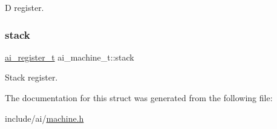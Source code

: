 D register. \mbox{\label{structai__machine__t_ae5314f51e27da843e45bbbb2907f2b12}} 
\subsubsection{\texorpdfstring{stack}{stack}}
{\footnotesize\ttfamily \hyperlink{machine_8h_a74ebfc967a5948f22ad4c9dffa32c233}{ai\+\_\+register\+\_\+t} ai\+\_\+machine\+\_\+t\+::stack}

Stack register. 

The documentation for this struct was generated from the following file\+:\begin{DoxyCompactItemize}
\item 
include/ai/\hyperlink{machine_8h}{machine.\+h}\end{DoxyCompactItemize}
